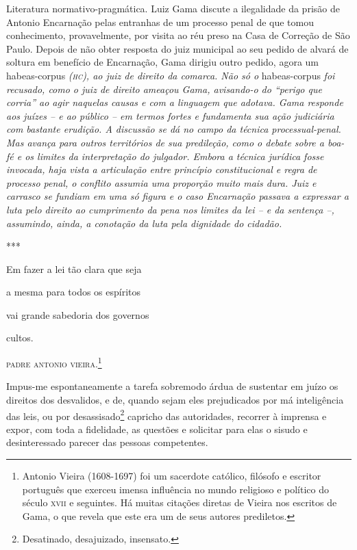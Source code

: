 \begin{didascalia}
Literatura normativo-pragmática. Luiz Gama discute a ilegalidade da
prisão de Antonio Encarnação pelas entranhas de um processo penal de que
tomou conhecimento, provavelmente, por visita ao réu preso na Casa de
Correção de São Paulo. Depois de não obter resposta do juiz municipal ao
seu pedido de alvará de soltura em benefício de Encarnação, Gama dirigiu
outro pedido, agora um habeas-corpus \emph{(\textsc{hc}), ao juiz de direito da
comarca. Não só o} habeas-corpus \emph{foi recusado, como o juiz de
direito ameaçou Gama, avisando-o do ``perigo que corria'' ao agir
naquelas causas e com a linguagem que adotava. Gama responde aos juízes
-- e ao público -- em termos fortes e fundamenta sua ação judiciária com
bastante erudição. A discussão se dá no campo da técnica
processual-penal. Mas avança para outros territórios de sua predileção,
como o debate sobre a boa-fé e os limites da interpretação do julgador.
Embora a técnica jurídica fosse invocada, haja vista a articulação entre
princípio constitucional e regra de processo penal, o conflito assumia
uma proporção muito mais dura. Juiz e carrasco se fundiam em uma só
figura e o caso Encarnação passava a expressar a luta pelo direito ao
cumprimento da pena nos limites da lei -- e da sentença --, assumindo,
ainda, a conotação da luta pela dignidade do cidadão.}
\end{didascalia}

***

Em fazer a lei tão clara que seja

a mesma para todos os espíritos

vai grande sabedoria dos governos

cultos.

\textsc{padre antonio vieira}.\footnote{Antonio Vieira (1608-1697) foi um
  sacerdote católico, filósofo e escritor português que exerceu imensa
  influência no mundo religioso e político do século \textsc{xvii} e seguintes.
  Há muitas citações diretas de Vieira nos escritos de Gama, o que
  revela que este era um de seus autores prediletos.}

Impus-me espontaneamente a tarefa sobremodo árdua de sustentar em juízo
os direitos dos desvalidos, e de, quando sejam eles prejudicados por má
inteligência das leis, ou por desassisado\footnote{Desatinado,
  desajuizado, insensato.} capricho das autoridades, recorrer à imprensa
e expor, com toda a fidelidade, as questões e solicitar para elas o
sisudo e desinteressado parecer das pessoas competentes.

